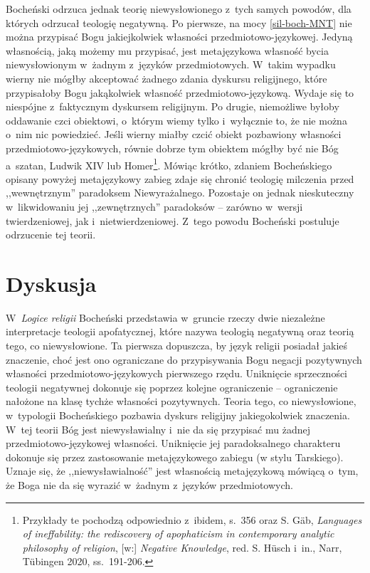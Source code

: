 Bocheński odrzuca jednak teorię niewysłowionego z~tych samych powodów, dla których odrzucał teologię negatywną. Po pierwsze, na mocy \ref{sil-boch-MNT} nie można przypisać Bogu jakiejkolwiek własności przedmiotowo-językowej. Jedyną własnością, jaką możemy mu przypisać, jest metajęzykowa własność bycia niewysłowionym w~żadnym z~języków przedmiotowych. W~takim wypadku wierny nie mógłby akceptować żadnego zdania dyskursu religijnego, które przypisałoby Bogu jakąkolwiek własność przedmiotowo-językową. Wydaje się to niespójne z~faktycznym dyskursem religijnym. Po drugie, niemożliwe byłoby oddawanie czci obiektowi, o~którym wiemy tylko i~wyłącznie to, że nie można o~nim nic powiedzieć. Jeśli wierny miałby czcić obiekt pozbawiony własności przedmiotowo-językowych, równie dobrze tym obiektem mógłby być nie Bóg a~szatan, Ludwik XIV lub Homer\footnote{Przykłady te pochodzą odpowiednio z~ibidem, s.~356 oraz S. Gäb, \textit{Languages of ineffability: the rediscovery of apophaticism in contemporary analytic philosophy of religion}, [w:] \textit{Negative Knowledge}, red. S. Hüsch i~in., Narr, Tübingen 2020, ss.~191-206.}. Mówiąc krótko, zdaniem Bocheńskiego opisany powyżej metajęzykowy zabieg zdaje się chronić teologię milczenia przed ,,wewnętrznym'' paradoksem Niewyrażalnego. Pozostaje on jednak nieskuteczny w~likwidowaniu jej ,,zewnętrznych'' paradoksów -- zarówno w~wersji twierdzeniowej, jak i~nietwierdzeniowej. Z~tego powodu Bocheński postuluje odrzucenie tej teorii.


\section{Dyskusja}\label{sil-boch-dyskusja}

W~\textit{Logice religii} Bocheński przedstawia w~gruncie rzeczy dwie niezależne interpretacje teologii apofatycznej, które nazywa teologią negatywną oraz teorią tego, co niewysłowione. Ta pierwsza dopuszcza, by język religii posiadał jakieś znaczenie, choć jest ono ograniczane do przypisywania Bogu negacji pozytywnych własności przedmiotowo-językowych pierwszego rzędu. Uniknięcie sprzeczności teologii negatywnej dokonuje się poprzez kolejne ograniczenie -- ograniczenie nałożone na klasę tychże
własności pozytywnych. Teoria tego, co niewysłowione, w~typologii Bocheńskiego pozbawia dyskurs religijny jakiegokolwiek znaczenia. W~tej teorii Bóg jest niewysławialny i~nie da się przypisać mu żadnej przedmiotowo-językowej własności. Uniknięcie jej paradoksalnego charakteru dokonuje się przez zastosowanie metajęzykowego zabiegu (w stylu Tarskiego). Uznaje się, że ,,niewysławialność'' jest własnością metajęzykową mówiącą o~tym, że Boga nie da się wyrazić w~żadnym z~języków przedmiotowych.

